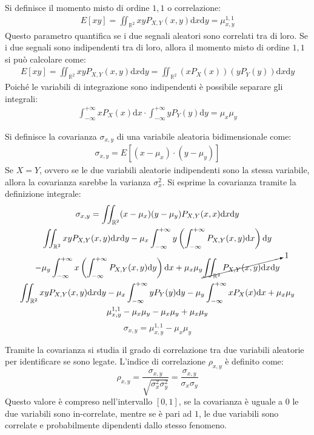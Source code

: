 \documentclass{article}
\newcommand{\df}{\mathrm{d}}
\numberwithin{equation}{subsection}
\begin{document}
Si definisce il momento misto di ordine $1,1$ o correlazione:
\begin{gather*}
    E[xy]=\displaystyle\iint_{\mathbb{R}^2}xyP_{X,Y}(x,y)\df x\df y=\mu_{x,y}^{1,1}
\end{gather*}
Questo parametro quantifica se i due segnali aleatori sono correlati tra di loro. Se i due segnali sono indipendenti tra di loro, allora il momento misto di ordine $1,1$ si 
può calcolare come:
\begin{gather}
    E[xy]=\displaystyle\iint_{\mathbb{R}^2}xyP_{X,Y}(x,y)\df x\df y=\iint_{\mathbb{R}^2}(xP_X(x))(yP_Y(y))\df x\df y
\end{gather}
Poiché le variabili di integrazione sono indipendenti è possibile separare gli integrali:
\begin{gather*}
    \displaystyle\int_{-\infty}^{+\infty}xP_X(x)\df x\cdot\int_{-\infty}^{+\infty}yP_Y(y)\df y=\mu_x\mu_y
\end{gather*}


Si definisce la covarianza $\sigma_{x,y}$ di una variabile aleatoria bidimensionale come:
\begin{gather*}
    \sigma_{x,y}=E[(x-\mu_x)\cdot(y-\mu_y)]
\end{gather*}
Se $X=Y$, ovvero se le due variabili aleatorie indipendenti sono la stessa variabile, allora la covarianza sarebbe la varianza $\sigma_x^2$. 
Si esprime la covarianza tramite la definizione integrale:
\begin{gather*}
    \sigma_{x,y}=\iint_{\mathbb{R}^2}(x-\mu_x)(y-\mu_y)P_{X,Y}(x,x)\df x\df y\\
    \displaystyle\iint_{\mathbb{R}^2}xyP_{X,Y}(x,y)\df x\df y-\mu_x\int_{-\infty}^{+\infty}y\left(\int_{-\infty}^{+\infty}P_{X,Y}(x,y)\df x\right)\df y\\
    -\displaystyle\mu_y\int_{-\infty}^{+\infty}x\left(\int_{-\infty}^{+\infty}P_{X,Y}(x,y)\df y\right)\df x+\mu_x\mu_y\cancelto{1}{\iint_{\mathbb{R}^2}P_{X,Y}(x,y)\df x\df y}\\
    \displaystyle\iint_{\mathbb{R}^2}xyP_{X,Y}(x,y)\df x\df y-\mu_x\int_{-\infty}^{+\infty}yP_Y(y)\df y-\mu_y\int_{-\infty}^{+\infty}xP_X(x)\df x+\mu_x\mu_y\\
    \mu_{x,y}^{1,1}-\mu_x\mu_y-\mu_x\mu_y+\mu_x\mu_y
\end{gather*}
\begin{equation}
    \sigma_{x,y}=\mu_{x,y}^{1,1}-\mu_x\mu_y
\end{equation}

Tramite la covarianza si studia il grado di correlazione tra due variabili aleatorie per identificare se sono legate. 
L'indice di correlazione $\rho_{x,y}$ è definito come:
\begin{equation}
    \rho_{x,y}=\displaystyle\frac{\sigma_{x,y}}{\sqrt{\sigma_x^2\sigma_y^2}}=\frac{\sigma_{x,y}}{\sigma_x\sigma_y}
\end{equation}
Questo valore è compreso nell'intervallo $[0,1]$, se la covarianza è uguale a $0$ le due variabili sono in-correlate, mentre se è pari ad $1$, le due variabili sono 
correlate e probabilmente dipendenti dallo stesso fenomeno. 
\end{document}
